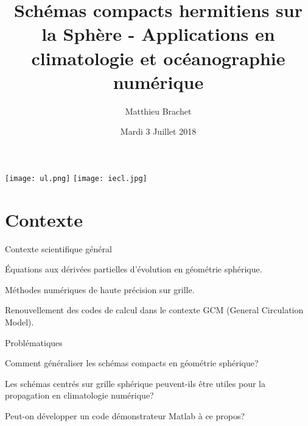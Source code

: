 \documentclass[11pt]{beamer}
\author[M. Brachet]{Matthieu Brachet}
\title[]{Schémas compacts hermitiens sur la Sphère - Applications en climatologie et océanographie numérique}
\date[3-7-2018]{Mardi 3 Juillet 2018}
\begin{document}
\begin{frame}
\titlepage
\begin{flushright}
\texttt{[image: ul.png]}
\texttt{[image: iecl.jpg]}
\end{flushright}
\end{frame}


\begin{frame}
\tableofcontents
\end{frame}

\section{Contexte}
\begin{frame}{Contexte scientifique général}
\begin{block}{}
Équations aux dérivées partielles d'évolution en géométrie sphérique.
\end{block}
\vspace{.7cm}
\begin{block}{}
Méthodes numériques de haute précision sur grille.
\end{block}
\vspace{.7cm}
\begin{block}{}
Renouvellement des codes de calcul dans le contexte GCM (General Circulation Model).
\end{block}
\end{frame}



\begin{frame}{Problématiques}
\begin{block}{}
Comment généraliser les schémas compacts en géométrie sphérique?
\end{block}
\vspace{.7cm}
\begin{block}{}
Les schémas centrés sur grille sphérique peuvent-ils être utiles pour la propagation en climatologie numérique?
\end{block}
\vspace{.7cm}
\begin{block}{}
Peut-on développer un code démonstrateur Matlab à ce propos?
\end{block}
\end{frame}
\end{document}
